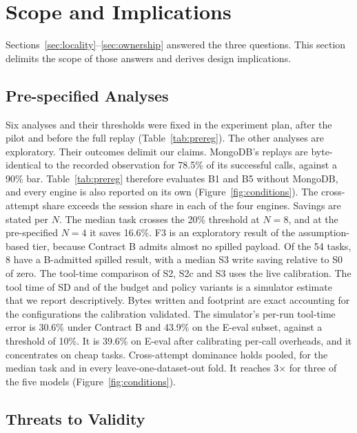 \section{Scope and Implications}
\label{sec:boundaries}

Sections~\ref{sec:locality}--\ref{sec:ownership} answered the three questions. This section delimits the scope of
those answers and derives design implications.

\subsection{Pre-specified Analyses}
\label{sec:prereg}



Six analyses and their thresholds were fixed in the experiment plan, after the pilot and before the full replay
(Table~\ref{tab:prereg}). The other analyses are exploratory. Their outcomes delimit our claims. MongoDB's replays are
byte-identical to the recorded observation for 78.5\% of its successful calls, against a 90\% bar.
Table~\ref{tab:prereg} therefore evaluates B1 and B5 without MongoDB, and every engine is also reported on its own
(Figure~\ref{fig:conditions}). The cross-attempt share exceeds the session share in each of the four engines.
Savings are stated per $N$. The median task crosses the 20\% threshold at $N=8$, and at the pre-specified $N=4$ it
saves 16.6\%. F3 is an exploratory result of the assumption-based tier, because Contract B admits almost no spilled
payload. Of the 54 tasks, 8 have a B-admitted spilled result, with a median S3 write saving relative to S0 of zero.
The tool-time comparison of S2, S2c and S3 uses the live calibration. The tool time of SD and of the budget and
policy variants is a simulator estimate that we report descriptively. Bytes written and footprint are exact
accounting for the configurations the calibration validated. The simulator's per-run tool-time error is 30.6\% under
Contract B and 43.9\% on the E-eval subset, against a threshold of 10\%. It is 39.6\% on E-eval after calibrating
per-call overheads, and it concentrates on cheap tasks. Cross-attempt dominance holds pooled, for the median task and
in every leave-one-dataset-out fold. It reaches 3$\times$ for three of the five models
(Figure~\ref{fig:conditions}).

\subsection{Threats to Validity}
\label{sec:threats}

